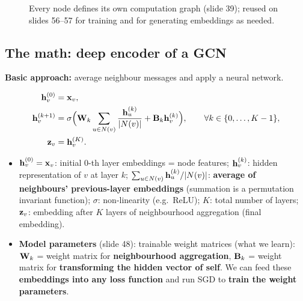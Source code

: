 \begin{figure}[htbp]
  \caption{Every node defines its own computation graph (slide 39); reused on
  slides 56--57 for training and for generating embeddings as needed.}
  \label{fig:lec03-six-trees}
\end{figure}

\subsection{The math: deep encoder of a GCN}\label{sec:lec03-gcn-math}

\textbf{Basic approach:} average neighbour messages and apply a neural network.

\begin{definition}\label{def:lec03-gcn}
  \begin{align}
    \mathbf{h}_v^{(0)} &= \mathbf{x}_v, \label{eq:lec03-gcn-init}\\
    \mathbf{h}_v^{(k+1)} &= \sigma\Bigl(\mathbf{W}_k\sum_{u\in N(v)}\frac{\mathbf{h}_u^{(k)}}{|N(v)|}
      + \mathbf{B}_k\mathbf{h}_v^{(k)}\Bigr),\qquad \forall k\in\{0,\dots,K-1\},
      \label{eq:lec03-gcn-update}\\
    \mathbf{z}_v &= \mathbf{h}_v^{(K)}. \label{eq:lec03-gcn-out}
  \end{align}
\end{definition}
\begin{itemize}
  \item $\mathbf{h}_v^{(0)}=\mathbf{x}_v$: initial 0-th layer embeddings = node features;
    $\mathbf{h}_v^{(k)}$: hidden representation of $v$ at layer $k$;
    $\sum_{u\in N(v)}\mathbf{h}_u^{(k)}/|N(v)|$: \textbf{average of neighbours'
    previous-layer embeddings} (summation is a permutation invariant function);
    $\sigma$: non-linearity (e.g.\ ReLU); $K$: total number of layers; $\mathbf{z}_v$:
    embedding after $K$ layers of neighbourhood aggregation (final embedding).
  \item \textbf{Model parameters} (slide 48): trainable weight matrices (what we
    learn): $\mathbf{W}_k$ = weight matrix for \textbf{neighbourhood aggregation},
    $\mathbf{B}_k$ = weight matrix for \textbf{transforming the hidden vector of
    self}. We can feed these \textbf{embeddings into any loss function} and run
    SGD to \textbf{train the weight parameters}.
\end{itemize}

